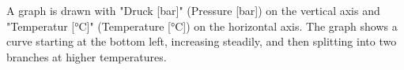 A graph is drawn with "Druck [bar]" (Pressure [bar]) on the vertical axis and "Temperatur [°C]" (Temperature [°C]) on the horizontal axis. The graph shows a curve starting at the bottom left, increasing steadily, and then splitting into two branches at higher temperatures.